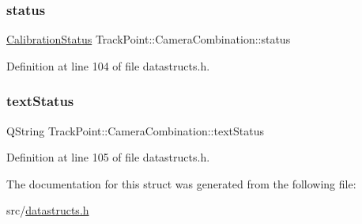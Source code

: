 \subsubsection{\texorpdfstring{status}{status}}
{\footnotesize\ttfamily \mbox{\hyperlink{namespace_track_point_acb9b2c2551da82b4cf9faf18d09335cd}{Calibration\+Status}} Track\+Point\+::\+Camera\+Combination\+::status}



Definition at line 104 of file datastructs.\+h.

\mbox{\label{struct_track_point_1_1_camera_combination_a33828548734f5e065d6ebacff3416bd2}} 
\subsubsection{\texorpdfstring{textStatus}{textStatus}}
{\footnotesize\ttfamily Q\+String Track\+Point\+::\+Camera\+Combination\+::text\+Status}



Definition at line 105 of file datastructs.\+h.



The documentation for this struct was generated from the following file\+:\begin{DoxyCompactItemize}
\item 
src/\mbox{\hyperlink{datastructs_8h}{datastructs.\+h}}\end{DoxyCompactItemize}

